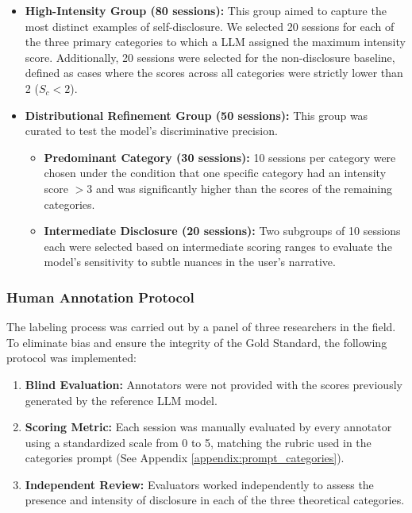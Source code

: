\begin{itemize}
    \item \textbf{High-Intensity Group (80 sessions):} This group aimed to capture the most distinct examples of self-disclosure. We selected 20 sessions for each of the three primary categories to which a LLM assigned the maximum intensity score. Additionally, 20 sessions were selected for the non-disclosure baseline, defined as cases where the scores across all categories were strictly lower than 2 ($S_c < 2$).
    
    \item \textbf{Distributional Refinement Group (50 sessions):} This group was curated to test the model's discriminative precision. 
    \begin{itemize}
        \item \textbf{Predominant Category (30 sessions):} 10 sessions per category were chosen under the condition that one specific category had an intensity score $> 3$ and was significantly higher than the scores of the remaining categories.
        \item \textbf{Intermediate Disclosure (20 sessions):} Two subgroups of 10 sessions each were selected based on intermediate scoring ranges to evaluate the model's sensitivity to subtle nuances in the user's narrative.
    \end{itemize}
\end{itemize}

\subsubsection{Human Annotation Protocol}
The labeling process was carried out by a panel of three researchers in the field. To eliminate bias and ensure the integrity of the Gold Standard, the following protocol was implemented:

\begin{enumerate}
    \item \textbf{Blind Evaluation:} Annotators were not provided with the scores previously generated by the reference LLM  model.
    \item \textbf{Scoring Metric:} Each session was manually evaluated by every annotator using a standardized scale from 0 to 5, matching the rubric used in the categories prompt (See Appendix \ref{appendix:prompt_categories}).
    \item \textbf{Independent Review:} Evaluators worked independently to assess the presence and intensity of disclosure in each of the three theoretical categories.
\end{enumerate}

